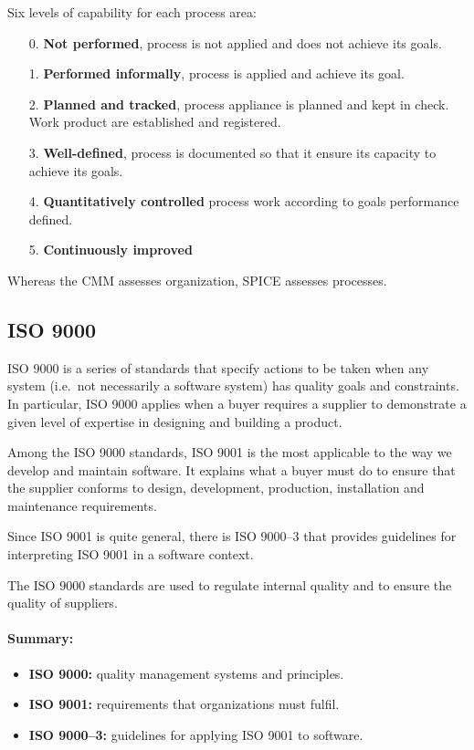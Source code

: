 Six levels of capability for each process area:
\begin{itemize}
    \item[0.] \textbf{Not performed}, process is not applied
     and does not achieve its goals.
    \item[1.] \textbf{Performed informally}, process is applied and achieve its
    goal.
    \item[2.] \textbf{Planned and tracked}, process appliance is planned and
    kept in check. Work product are established and registered.
    \item[3.] \textbf{Well-defined}, process is documented so that it ensure its
    capacity to achieve its goals.
    \item[4.] \textbf{Quantitatively controlled} process work according to
    goals performance defined.
    \item[5.] \textbf{Continuously improved}
\end{itemize}

Whereas the CMM assesses organization, SPICE assesses processes.

\subsection{ISO 9000}

ISO 9000 is a series of standards that specify actions to be taken when any
system (i.e.\ not necessarily a software system) has quality goals and
constraints. In particular, ISO 9000 applies when a buyer requires a supplier
to demonstrate a given level of expertise in designing and building a product.
\newline

Among the ISO 9000 standards, ISO 9001 is the most applicable to the way we develop and
maintain software. It explains what a buyer must do to ensure that the supplier conforms to
design, development, production, installation and maintenance requirements.
\newline

Since ISO 9001 is quite general, there is ISO 9000--3 that provides guidelines for interpreting
ISO 9001 in a software context.
\newline

The ISO 9000 standards are used to regulate internal quality and to ensure the quality of
suppliers.
\newline

\paragraph{Summary:}
\begin{itemize}
    \item \textbf{ISO 9000:} quality management systems and principles.
    \item \textbf{ISO 9001:} requirements that organizations must fulfil.
    \item \textbf{ISO 9000--3:} guidelines for applying ISO 9001 to software.
\end{itemize}
